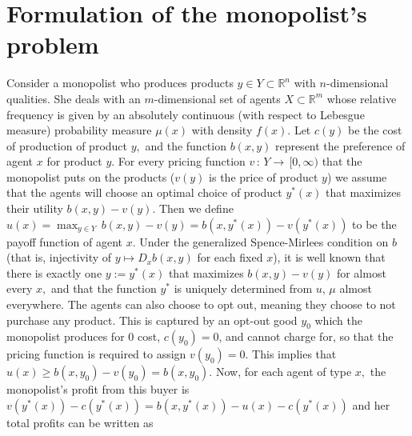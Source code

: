\documentclass[12pt,reqno]{amsart}
\begin{document}

\section{Formulation of the monopolist's problem}
Consider a monopolist who produces products $y \in Y\subset \mathbb{R}^n$ with $n$-dimensional qualities. She deals with an $m$-dimensional set of agents $X\subset \mathbb{R}^m$ whose relative frequency is given by an absolutely continuous (with respect to Lebesgue measure) probability measure $\mu(x)$ with density $f(x)$. Let $c(y)$ be the cost of production of product $y,$ and the function $b(x,y)$ represent the preference of agent $x$ for product $y.$ For every pricing function $v\,:\, Y\to\,[0,\infty)$ that the monopolist puts on the products ($v(y)$ is the price of product $y$) we assume that the agents will choose an optimal choice of product $y^*(x)$ that maximizes their utility $b(x,y)-v(y).$ Then we define $u(x)=\max_{y\in Y} \,b(x,y)-v(y)=b(x,y^*(x))-v(y^*(x))$ to be the payoff function of agent $x.$ Under the generalized Spence-Mirlees condition \cite{Santambrogio} on $b$ (that is, injectivity of $y \mapsto D_xb(x,y)$ for each fixed $x$),  it is well known that there is exactly one $y:=y^*(x)$ that maximizes $b(x,y)-v(y)$ for almost every $x,$ and that the function $y^*$ is uniquely determined from $u$, $\mu$ almost everywhere. The agents can also choose to opt out, meaning they choose to not purchase any product. This is captured by an opt-out good $y_0$ which the monopolist produces for $0$ cost, $c(y_0)=0$, and cannot charge for, so that the pricing function is required to assign $v(y_0)=0.$ This implies that $u(x)\ge b(x,y_0)-v(y_0)=b(x,y_0).$ Now, for each agent of type $x,$ the monopolist's profit from this buyer is $v(y^*(x))-c(y^*(x))=b(x,y^*(x))-u(x)-c(y^*(x))$ and her total profits can be written as
\end{document}

